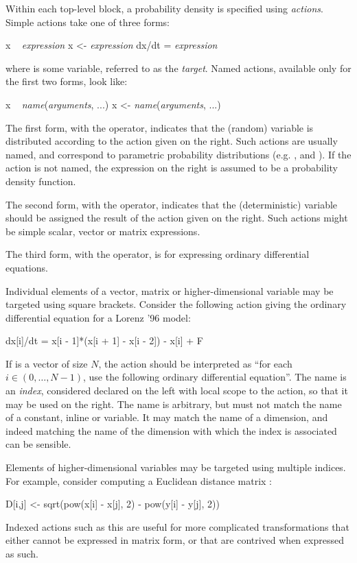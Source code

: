 Within each top-level block, a probability density is specified using
\emph{actions}. Simple actions take one of three forms:
\begin{bicode}
x ~ \textsl{expression}
x <- \textsl{expression}
dx/dt = \textsl{expression}
\end{bicode}
where  is some variable, referred to as the \emph{target}. Named
actions, available only for the first two forms, look like:
\begin{bicode}
x ~ \textsl{name}(\textsl{arguments}, ...)
x <- \textsl{name}(\textsl{arguments}, ...)
\end{bicode}

The first form, with the \bitt{\~{}} operator, indicates that the (random)
variable  is distributed according to the action given on the
right. Such actions are usually named, and correspond to parametric
probability distributions (e.g.  ,  and
). If the action is not named, the expression on the right
is assumed to be a probability density function.

The second form, with the \bitt{<-} operator, indicates that the
(deterministic) variable  should be assigned the result of the action
given on the right. Such actions might be simple scalar,
vector or matrix expressions.

The third form, with the \bitt{=} operator, is for expressing ordinary
differential equations.

Individual elements of a vector, matrix or higher-dimensional variable may be
targeted using square brackets. Consider the following action giving the
ordinary differential equation for a Lorenz '96 model:
\begin{bicode}
dx[i]/dt = x[i - 1]*(x[i + 1] - x[i - 2]) - x[i] + F
\end{bicode}
If  is a vector of size $N$, the action should be interpreted as ``for
each $i \in (0,\ldots,N-1)$, use the following ordinary differential
equation''. The name  is an \emph{index}, considered declared on the
left with local scope to the action, so that it may be used on the right. The
name  is arbitrary, but must not match the name of a constant, inline
or variable. It may match the name of a dimension, and indeed matching the
name of the dimension with which the index is associated can be sensible.

Elements of higher-dimensional variables may be targeted using multiple
indices. For example, consider computing a Euclidean distance matrix :
\begin{bicode}
D[i,j] <- sqrt(pow(x[i] - x[j], 2) - pow(y[i] - y[j], 2))
\end{bicode}
Indexed actions such as this are useful for more complicated transformations
that either cannot be expressed in matrix form, or that are
contrived when expressed as such.

